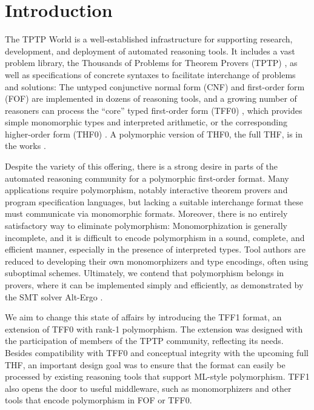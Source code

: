 \section{Introduction}
\label{sec_intro}

The TPTP World \cite{sutcliffe-2010-world} is a well-established infrastructure
for supporting research, development, and deployment of automated reasoning
tools. It includes a vast problem library, the Thousands of Problems for Theorem
Provers (TPTP) \cite{sutcliffe-2009-lib}, as well as specifications of concrete
syntaxes to facilitate interchange of problems and solutions: The untyped
conjunctive normal form (CNF) and first-order form (FOF) are implemented in
dozens of reasoning tools, and a growing number of reasoners can process the
``core'' typed first-order form (TFF0) \cite{sutcliffe-et-al-2012-tff0},
which provides simple monomorphic types and interpreted arithmetic,
or the corresponding higher-order form (THF0) \cite{benzmueller-et-al-2008-thf0}.
A polymorphic version of THF0, the full THF, is in the works
\cite{sutcliffe-benzmueller-2010}.

Despite the variety of this offering, there is a strong desire in parts of the automated
reasoning community for a polymorphic first-order format. Many applications
require polymorphism, notably interactive theorem provers and program
specification languages, but lacking a suitable interchange format these
must communicate via monomorphic formats. Moreover, there is no entirely
satisfactory way to eliminate polymorphism: Monomorphization is generally
incomplete, and it is difficult to encode polymorphism in a sound, complete, and
efficient manner, especially in the presence of interpreted types. Tool authors
are reduced to developing their own monomorphizers and type encodings, often
using suboptimal schemes. Ultimately, we contend that polymorphism belongs in
provers, where it can be implemented simply and efficiently, as demonstrated by
the SMT solver Alt-Ergo \cite{bobot-et-al-2008}.

We aim to change this state of affairs by introducing the TFF1
format, an extension of TFF0 with rank-1 polymorphism. The
extension was designed with the participation of members of the TPTP community,
reflecting its needs.
Besides compatibility with TFF0 and conceptual integrity with the upcoming full
THF, an important design goal was to ensure that the format can easily be
processed by existing reasoning tools that support ML-style polymorphism. TFF1
also opens the door to useful middleware, such as monomorphizers and other
tools that encode polymorphism in FOF or TFF0.

